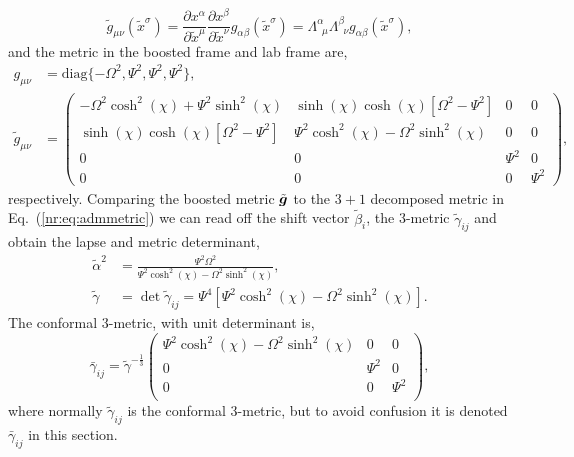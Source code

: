 \begin{equation}
\tilde{g}_{\mu\nu}(\tilde{x}^\sigma)= \frac{\partial x^\alpha}{\partial \tilde{x}^\mu}  \frac{\partial x^\beta}{\partial \tilde{x}^\nu}g_{\alpha\beta}(\tilde{x}^\sigma) = \Lambda^\alpha_{\,\,\,\mu}\Lambda^\beta_{\,\,\,\nu} g_{\alpha\beta}(\tilde{x}^\sigma),
\end{equation}
and the metric in the boosted frame and lab frame are,
\begin{align}
 g_{\mu\nu} &= \mathrm{diag} \{ -\Omega^2, \Psi^2,  \Psi^2, \Psi^2\} ,\\
 \tilde{g}_{\mu\nu}&=\begin{pmatrix} -\Omega^2\cosh^2 (\chi) + \Psi^2 \sinh^2 (\chi) & \sinh(\chi)\cosh(\chi)\left[\Omega^2-\Psi^2\right] & 0& 0 \\  \sinh(\chi)\cosh(\chi)\left[\Omega^2-\Psi^2\right] & \Psi^2 \cosh^2 (\chi) - \Omega^2 \sinh^2 (\chi) & 0 & 0\\ 0 & 0&\Psi^2&0 \\ 0&0&0&\Psi^2\end{pmatrix},
 \end{align}
 respectively. Comparing the boosted metric $\tilde{\boldsymbol{g}}$ to the $3+1$ decomposed metric in Eq.~(\ref{nr:eq:admmetric}) we can read off the shift vector $\tilde{\beta}_i$, the 3-metric $\tilde{\gamma}_{ij}$ and obtain the lapse and metric determinant,
\begin{align}
\tilde{\alpha}^2 &= \frac{\Psi ^2 \Omega ^2}{\Psi ^2 \cosh ^2(\chi) -\Omega ^2 \sinh ^2(\chi) },\\
\tilde{\gamma} &= \det \tilde{\gamma}_{ij} = \Psi^4\left[ \Psi^2 \cosh^2 (\chi) - \Omega^2 \sinh^2(\chi)\right].
\end{align}
The conformal 3-metric, with unit determinant is,
\begin{equation} \bar{\gamma}_{ij} = \tilde{\gamma}^{-\frac{1}{3}}\left(
\begin{array}{ccc}
 \Psi ^2 \cosh ^2(\chi) -\Omega ^2 \sinh ^2(\chi)  & 0 & 0 \\
 0 & \Psi ^2 & 0 \\
 0 & 0 & \Psi ^2 \\
\end{array}
\right),\end{equation}
where normally $\tilde{\gamma}_{ij}$ is the conformal 3-metric, but to avoid confusion it is denoted $\bar{\gamma}_{ij}$ in this section.

